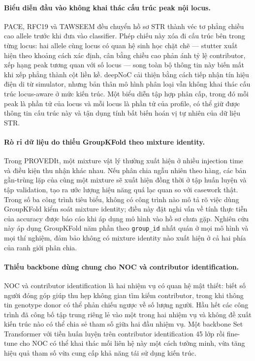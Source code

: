 \documentclass[12pt,a4paper]{article}
\begin{document}
\paragraph{Biểu diễn đầu vào không khai thác cấu trúc peak nội locus.}
PACE, RFC19 và TAWSEEM đều chuyển hồ sơ STR thành véc tơ phẳng chiều cao allele trước khi đưa vào classifier. Phép chiếu này xóa đi cấu trúc bên trong từng locus: hai allele cùng locus có quan hệ sinh học chặt chẽ — stutter xuất hiện theo khoảng cách xác định, cân bằng chiều cao phản ánh tỷ lệ contributor, xếp hạng peak tương quan với số locus — song toàn bộ thông tin này biến mất khi xếp phẳng thành cột liền kề. deepNoC cải thiện bằng cách tiếp nhận tín hiệu điện di từ simulator, nhưng bản thân mô hình phân loại vẫn không khai thác cấu trúc locus-aware ở mức kiến trúc. Một biểu diễn tập hợp phân cấp, trong đó mỗi peak là phần tử của locus và mỗi locus là phần tử của profile, có thể giữ được thông tin cấu trúc này và tận dụng tính bất biến hoán vị tự nhiên của dữ liệu STR.

\paragraph{Rò rỉ dữ liệu do thiếu GroupKFold theo mixture identity.}
Trong PROVEDIt, một mixture vật lý thường xuất hiện ở nhiều injection time và điều kiện thu nhận khác nhau. Nếu phân chia ngẫu nhiên theo hàng, các bản gần-trùng lặp của cùng một mixture sẽ xuất hiện đồng thời ở tập huấn luyện và tập validation, tạo ra ước lượng hiệu năng quá lạc quan so với casework thật. Trong số ba công trình tiêu biểu, không có công trình nào mô tả rõ việc dùng GroupKFold kiểm soát mixture identity; điều này đặt nghi vấn về tính thực tiễn của accuracy được báo cáo khi áp dụng mô hình vào hồ sơ chưa gặp. Nghiên cứu này áp dụng GroupKFold năm phần theo \texttt{group\_id} nhất quán ở mọi mô hình và mọi thí nghiệm, đảm bảo không có mixture identity nào xuất hiện ở cả hai phía của ranh giới phân chia.

\paragraph{Thiếu backbone dùng chung cho NOC và contributor identification.}
NOC và contributor identification là hai nhiệm vụ có quan hệ mật thiết: biết số người đóng góp giúp thu hẹp không gian tìm kiếm contributor, trong khi thông tin genotype donor có thể phản chiếu ngược về số lượng người. Hầu hết các công trình đã công bố tập trung riêng lẻ vào một trong hai nhiệm vụ và không đề xuất kiến trúc nào có thể chia sẻ tham số giữa hai đầu nhiệm vụ. Một backbone Set Transformer với tiền huấn luyện trên contributor identification 45 lớp rồi fine-tune cho NOC có thể khai thác mối liên hệ này một cách tường minh, vừa tăng hiệu quả tham số vừa cung cấp khả năng tái sử dụng kiến trúc.
\end{document}
